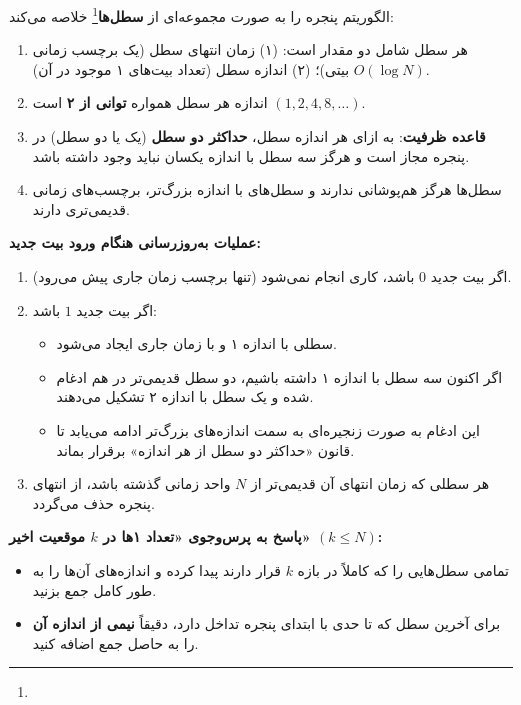 \begin{definition}
الگوریتم پنجره را به صورت مجموعه‌ای از \textbf{سطل‌ها}\footnote{} خلاصه می‌کند:
\begin{enumerate}
    \item هر سطل شامل دو مقدار است: (۱) زمان انتهای سطل (یک برچسب زمانی $O(\log N)$ بیتی)؛ (۲) اندازه سطل (تعداد بیت‌های ۱ موجود در آن).
    \item اندازه هر سطل همواره \textbf{توانی از ۲} است $(1, 2, 4, 8, \dots)$.
    \item \textbf{قاعده ظرفیت}: به ازای هر اندازه سطل، \textbf{حداکثر دو سطل} (یک یا دو سطل) در پنجره مجاز است و هرگز سه سطل با اندازه یکسان نباید وجود داشته باشد.
    \item سطل‌ها هرگز هم‌پوشانی ندارند و سطل‌های با اندازه بزرگ‌تر، برچسب‌های زمانی قدیمی‌تری دارند.
\end{enumerate}
\end{definition}

\begin{algorithmbox}
\textbf{عملیات به‌روزرسانی هنگام ورود بیت جدید:}
\begin{enumerate}
    \item اگر بیت جدید $0$ باشد، کاری انجام نمی‌شود (تنها برچسب زمان جاری پیش می‌رود).
    \item اگر بیت جدید $1$ باشد:
    \begin{itemize}
        \item سطلی با اندازه ۱ و با زمان جاری ایجاد می‌شود.
        \item اگر اکنون سه سطل با اندازه ۱ داشته باشیم، دو سطل قدیمی‌تر در هم ادغام شده و یک سطل با اندازه ۲ تشکیل می‌دهند.
        \item این ادغام به صورت زنجیره‌ای به سمت اندازه‌های بزرگ‌تر ادامه می‌یابد تا قانون «حداکثر دو سطل از هر اندازه» برقرار بماند.
    \end{itemize}
    \item هر سطلی که زمان انتهای آن قدیمی‌تر از $N$ واحد زمانی گذشته باشد، از انتهای پنجره حذف می‌گردد.
\end{enumerate}

\textbf{پاسخ به پرس‌وجوی «تعداد ۱ها در $k$ موقعیت اخیر» $(k \le N)$:}
\begin{itemize}
    \item تمامی سطل‌هایی را که کاملاً در بازه $k$ قرار دارند پیدا کرده و اندازه‌های آن‌ها را به طور کامل جمع بزنید.
    \item برای آخرین سطل که تا حدی با ابتدای پنجره تداخل دارد، دقیقاً \textbf{نیمی از اندازه آن} را به حاصل جمع اضافه کنید.
\end{itemize}
\end{algorithmbox}


